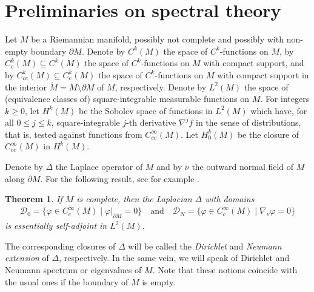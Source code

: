 \documentclass[a4paper,11pt]{amsart}
\numberwithin{equation}{section}
\newtheorem{thm}[equation]{Theorem}
\theoremstyle{definition}
\def\vf{\varphi}
\begin{document}
\section{Preliminaries on spectral theory}
\label{secan}
Let $M$ be a Riemannian manifold, possibly not complete and possibly with non-empty boundary $\partial M$.
Denote by $C^k(M)$ the space of $C^k$-functions on $M$,
by $C^k_{c}(M)\subseteq C^k(M)$ the space of $C^k$-functions on $M$ with compact support,
and by $C^k_{cc}(M)\subseteq C^k_c(M)$ the space of $C^k$-functions on $M$ with compact support in the interior $\mathring M=M\setminus\partial M$ of $M$, respectively.
Denote by $L^2(M)$ the space of (equivalence classes of) square-integrable measurable functions on $M$.
For integers $k\ge0$, let $H^k(M)$ be the Sobolev space of functions in $L^2(M)$ which have, for all $0\le j\le k$, square-integrable $j$-th derivative $\nabla^{j}f$ in the sense of distributions, that is, tested against functions from $C^\infty_{cc}(M)$.
Let $H^k_0(M)$ be the closure of $C^\infty_{cc}(M)$ in $H^k(M)$.

Denote by $\Delta$ the Laplace operator of $M$ and by $\nu$ the outward normal field of $M$ along $\partial M$.
For the following result, see for example \cite[page 85]{T2}.

\begin{thm}
If $M$ is complete, then the Laplacian $\Delta$ with domains
\begin{align*}
  \mathcal{D}_0 = \{\vf\in C^\infty_c(M) \mid \vf|_{\partial M}=0\}
  \quad\text{and}\quad
  \mathcal{D}_N = \{\vf\in C^\infty_c(M) \mid \nabla_\nu\vf=0\}
\end{align*}
is essentially self-adjoint in $L^2(M)$.
\end{thm}

The corresponding closures of $\Delta$ will be called the \emph{Dirichlet} and \emph{Neumann extension} of $\Delta$, respectively.
In the same vein, we will speak of Dirichlet and Neumann spectrum or eigenvalues of $M$.
Note that these notions coincide with the usual ones if the boundary of $M$ is empty.
\end{document}
